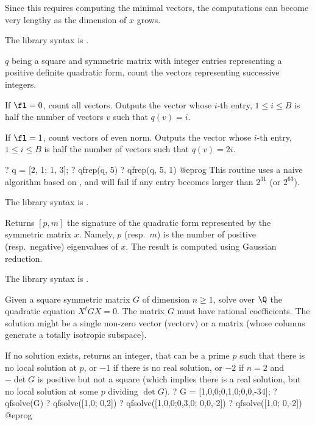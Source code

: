 Since this requires computing the minimal vectors, the computations can
become very lengthy as the dimension of $x$ grows.

The library syntax is .

\label{se:qfrep}
$q$ being a square and symmetric matrix with integer entries representing a
positive definite quadratic form, count the vectors representing successive
integers.

\item If $\fl = 0$, count all vectors. Outputs the vector whose $i$-th
entry, $1 \leq i \leq B$ is half the number of vectors $v$ such that $q(v)=i$.

\item If $\fl = 1$, count vectors of even norm. Outputs the vector
whose $i$-th entry, $1 \leq i \leq B$ is half the number of vectors such
that $q(v) = 2i$.

\bprog
? q = [2, 1; 1, 3];
? qfrep(q, 5)
? qfrep(q, 5, 1)
@eprog\noindent
This routine uses a naive algorithm based on , and
will fail if any entry becomes larger than $2^{31}$ (or $2^{63}$).

The library syntax is .

\label{se:qfsign}
Returns $[p,m]$ the signature of the quadratic form represented by the
symmetric matrix $x$. Namely, $p$ (resp.~$m$) is the number of positive
(resp.~negative) eigenvalues of $x$. The result is computed using Gaussian
reduction.

The library syntax is .

\label{se:qfsolve}
Given a square symmetric matrix $G$ of dimension $n \geq 1$, solve over
$\Q$ the quadratic equation $X^tGX = 0$. The matrix $G$ must have rational
coefficients. The solution might be a single non-zero vector (vectorv) or a
matrix (whose columns generate a totally isotropic subspace).

If no solution exists, returns an integer, that can be a prime $p$ such that
there is no local solution at $p$, or $-1$ if there is no real solution,
or $-2$ if $n = 2$ and $-\det G$ is positive but not a square (which implies
there is a real solution, but no local solution at some $p$ dividing $\det G$).
\bprog
? G = [1,0,0;0,1,0;0,0,-34];
? qfsolve(G)
? qfsolve([1,0; 0,2])
? qfsolve([1,0,0;0,3,0; 0,0,-2])
? qfsolve([1,0; 0,-2])
@eprog

